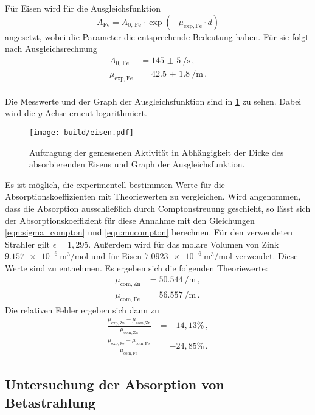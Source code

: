 Für Eisen wird für die Ausgleichsfunktion
\begin{equation*}
  A_\mathrm{Fe} = A_{0,\,\text{Fe}} \cdot \exp(-\mu_{\text{exp},\,\text{Fe}} \cdot d)
\end{equation*}
angesetzt, wobei die Parameter die entsprechende Bedeutung haben.
Für sie folgt nach Ausgleichsrechnung
\begin{align*}
  A_{0,\,\text{Fe}} &= \SI{145(5)}{\per\second}\,,\\
  \mu_{\text{exp},\,\text{Fe}} &=  \SI{42.5(18)}{\per\meter}\,.
\end{align*}
\\
Die Messwerte und der Graph der Ausgleichsfunktion sind in \ref{fig:eisen}
zu sehen. Dabei wird die $y$-Achse erneut logarithmiert.

\begin{figure}
  \centering
  \texttt{[image: build/eisen.pdf]}
  \caption{Auftragung der gemessenen Aktivität in Abhängigkeit der Dicke des absorbierenden Eisens und Graph der Ausgleichsfunktion.}
  \label{fig:eisen}
\end{figure}

Es ist möglich, die experimentell bestimmten Werte für die Absorptionskoeffizienten mit
Theoriewerten zu vergleichen. Wird angenommen, dass die Absorption ausschließlich durch
Comptonstreuung geschieht, so lässt sich der Absorptionskoeffizient für diese Annahme
mit den Gleichungen \eqref{eqn:sigma_compton} und \eqref{eqn:mucompton} berechnen.
Für den verwendeten Strahler gilt $\epsilon = 1{,}295$. Außerdem wird für das molare Volumen
von Zink $\SI{9.157e-6}{\cubic\meter\per\mole}$ und für Eisen $\SI{7.0923e-6}{\cubic\meter\per\mole}$
verwendet. Diese Werte sind \cite{molarvolume} zu entnehmen. Es ergeben sich die folgenden Theoriewerte:
\begin{align*}
  \mu_{\text{com},\,\text{Zn}} &=  \SI{50.544}{\per\meter}\,,\\
  \mu_{\text{com},\,\text{Fe}} &=  \SI{56.557}{\per\meter}\,.
\end{align*}
Die relativen Fehler ergeben sich dann zu
\begin{align*}
  \frac{\mu_{\text{exp},\,\text{Zn}} - \mu_{\text{com},\,\text{Zn}}}{\mu_{\text{com},\,\text{Zn}}} &= -14{,}13 \% \,,\\
  \frac{\mu_{\text{exp},\,\text{Fe}} - \mu_{\text{com},\,\text{Fe}}}{\mu_{\text{com},\,\text{Fe}}} &= -24{,}85 \% \,.
\end{align*}

\subsection{Untersuchung der Absorption von Betastrahlung}
\label{subsec:auswertungbeta}

